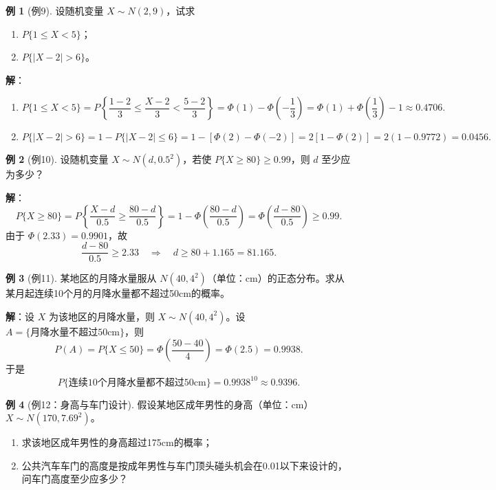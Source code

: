 \documentclass[11pt,a4paper]{report}
\theoremstyle{definition}
\newtheorem{example}{例}[chapter]
\begin{document}
\begin{example}[例9]
设随机变量 $X \sim N(2,9)$，试求
\begin{enumerate}[label=(\arabic*),leftmargin=2em]
    \item $P\{1 \leq X < 5\}$；
    \item $P\{|X-2| > 6\}$。
\end{enumerate}
\end{example}

\textbf{解}：
\begin{enumerate}[label=(\arabic*),leftmargin=2em]
    \item
    \[
    P\{1 \leq X < 5\} = P\left\{\frac{1-2}{3} \leq \frac{X-2}{3} < \frac{5-2}{3}\right\} = \Phi(1)-\Phi\left(-\frac{1}{3}\right) = \Phi(1)+\Phi\left(\frac{1}{3}\right)-1 \approx \boxed{0.4706}.
    \]
    
    \item
    \[
    P\{|X-2|>6\} = 1-P\{|X-2|\leq 6\} = 1-\left[\Phi(2)-\Phi(-2)\right] = 2[1-\Phi(2)] = 2(1-0.9772) = \boxed{0.0456}.
    \]
\end{enumerate}

\begin{example}[例10]
设随机变量 $X \sim N(d,0.5^2)$，若使 $P\{X \geq 80\} \geq 0.99$，则 $d$ 至少应为多少？
\end{example}

\textbf{解}：
\[
P\{X \geq 80\} = P\left\{\frac{X-d}{0.5} \geq \frac{80-d}{0.5}\right\} = 1-\Phi\left(\frac{80-d}{0.5}\right) = \Phi\left(\frac{d-80}{0.5}\right) \geq 0.99.
\]
由于 $\Phi(2.33)=0.9901$，故
\[
\frac{d-80}{0.5} \geq 2.33 \quad\Longrightarrow\quad d \geq 80+1.165 = \boxed{81.165}.
\]

\begin{example}[例11]
某地区的月降水量服从 $N(40,4^2)$（单位：cm）的正态分布。求从某月起连续10个月的月降水量都不超过50cm的概率。
\end{example}

\textbf{解}：设 $X$ 为该地区的月降水量，则 $X \sim N(40,4^2)$。设 $A=\{\text{月降水量不超过50cm}\}$，则
\[
P(A) = P\{X \leq 50\} = \Phi\left(\frac{50-40}{4}\right) = \Phi(2.5) = 0.9938.
\]
于是
\[
P\{\text{连续10个月降水量都不超过50cm}\} = 0.9938^{10} \approx \boxed{0.9396}.
\]

\begin{example}[例12：身高与车门设计]
假设某地区成年男性的身高（单位：cm）$X \sim N(170,7.69^2)$。
\begin{enumerate}[label=(\arabic*),leftmargin=2em]
    \item 求该地区成年男性的身高超过175cm的概率；
    \item 公共汽车车门的高度是按成年男性与车门顶头碰头机会在0.01以下来设计的，问车门高度至少应多少？
\end{enumerate}
\end{example}
\end{document}
